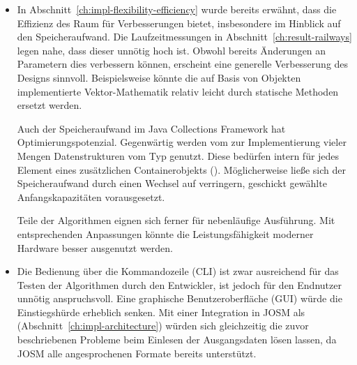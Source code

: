 \documentclass[../main/thesis.tex]{subfiles}
\begin{document}
\begin{itemize}
\item
In Abschnitt~\ref{ch:impl-flexibility-efficiency} wurde bereits erwähnt, dass die Effizienz des  Raum für Verbesserungen bietet, insbesondere im Hinblick auf den Speicheraufwand.
Die Laufzeitmessungen in Abschnitt~\ref{ch:result-railways} legen nahe, dass dieser unnötig hoch ist.
Obwohl bereits Änderungen an Parametern dies verbessern können, erscheint eine generelle Verbesserung des Designs sinnvoll.
Beispielsweise könnte die auf Basis von Objekten implementierte Vektor-Mathematik relativ leicht durch statische Methoden ersetzt werden.

Auch der Speicheraufwand im Java Collections Framework hat Optimierungspotenzial.
Gegenwärtig werden vom  zur Implementierung vieler Mengen Datenstrukturen vom Typ  genutzt.
Diese bedürfen intern für jedes Element eines zusätzlichen Containerobjekts ().
Möglicherweise ließe sich der Speicheraufwand durch einen Wechsel auf  verringern, geschickt gewählte Anfangskapazitäten vorausgesetzt.

Teile der Algorithmen eignen sich ferner für nebenläufige Ausführung.
Mit entsprechenden Anpassungen könnte die Leistungsfähigkeit moderner Hardware besser ausgenutzt werden.

\item
Die Bedienung über die Kommandozeile (CLI) ist zwar ausreichend für das Testen der Algorithmen durch den Entwickler, ist jedoch für den Endnutzer unnötig anspruchsvoll.
Eine graphische Benutzeroberfläche (GUI) würde die Einstiegshürde erheblich senken.
Mit einer Integration in JOSM als  (Abschnitt~\ref{ch:impl-architecture}) würden sich gleichzeitig die zuvor beschriebenen Probleme beim Einlesen der Ausgangsdaten lösen lassen, da JOSM alle angesprochenen Formate bereits unterstützt.

\end{itemize}
\end{document}
